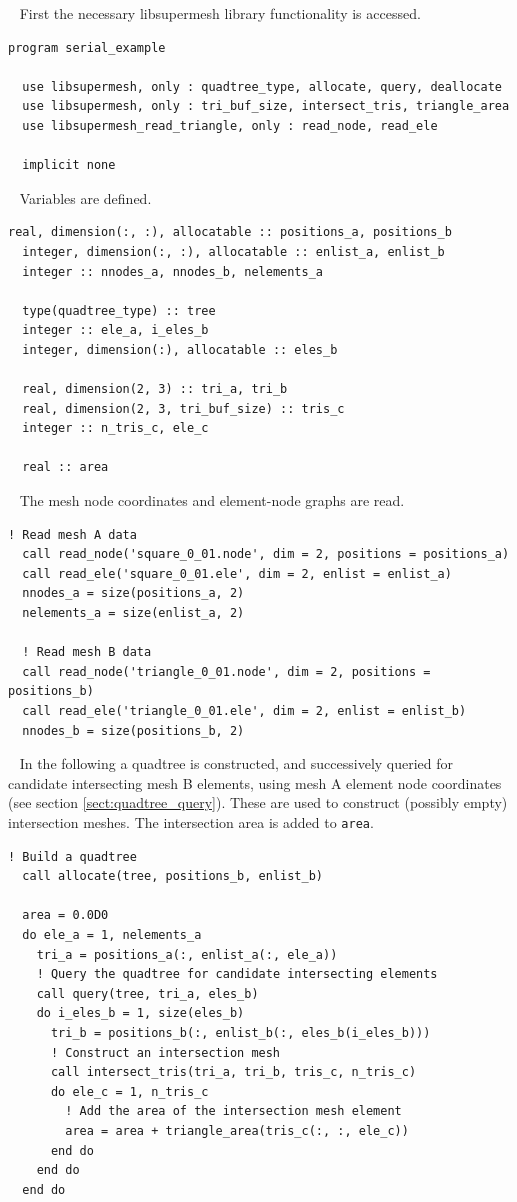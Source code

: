 \documentclass{article}
\begin{document}
~\newline
First the necessary libsupermesh library functionality is accessed.
\begin{lstlisting}[language=FORTRAN]
program serial_example

  use libsupermesh, only : quadtree_type, allocate, query, deallocate
  use libsupermesh, only : tri_buf_size, intersect_tris, triangle_area
  use libsupermesh_read_triangle, only : read_node, read_ele

  implicit none
\end{lstlisting}

~\newline
Variables are defined.
\begin{lstlisting}[language=FORTRAN]
  real, dimension(:, :), allocatable :: positions_a, positions_b
  integer, dimension(:, :), allocatable :: enlist_a, enlist_b
  integer :: nnodes_a, nnodes_b, nelements_a
  
  type(quadtree_type) :: tree
  integer :: ele_a, i_eles_b
  integer, dimension(:), allocatable :: eles_b
  
  real, dimension(2, 3) :: tri_a, tri_b
  real, dimension(2, 3, tri_buf_size) :: tris_c
  integer :: n_tris_c, ele_c
  
  real :: area
\end{lstlisting}

~\newline
The mesh node coordinates and element-node graphs are read.
\begin{lstlisting}[language=FORTRAN]
  ! Read mesh A data
  call read_node('square_0_01.node', dim = 2, positions = positions_a)
  call read_ele('square_0_01.ele', dim = 2, enlist = enlist_a)
  nnodes_a = size(positions_a, 2)
  nelements_a = size(enlist_a, 2)
  
  ! Read mesh B data
  call read_node('triangle_0_01.node', dim = 2, positions = positions_b)
  call read_ele('triangle_0_01.ele', dim = 2, enlist = enlist_b)
  nnodes_b = size(positions_b, 2)
\end{lstlisting}

~\newline
In the following a quadtree is constructed, and successively
queried for candidate intersecting mesh B elements, using mesh A element node
coordinates (see section \ref{sect:quadtree_query}). These are used to construct
(possibly empty) intersection meshes. The intersection area is added to
\verb+area+.
\begin{lstlisting}[language=FORTRAN]
  ! Build a quadtree
  call allocate(tree, positions_b, enlist_b)
  
  area = 0.0D0
  do ele_a = 1, nelements_a
    tri_a = positions_a(:, enlist_a(:, ele_a))
    ! Query the quadtree for candidate intersecting elements
    call query(tree, tri_a, eles_b)
    do i_eles_b = 1, size(eles_b)
      tri_b = positions_b(:, enlist_b(:, eles_b(i_eles_b)))
      ! Construct an intersection mesh
      call intersect_tris(tri_a, tri_b, tris_c, n_tris_c)
      do ele_c = 1, n_tris_c
        ! Add the area of the intersection mesh element
        area = area + triangle_area(tris_c(:, :, ele_c))
      end do
    end do
  end do
\end{lstlisting}
\end{document}
